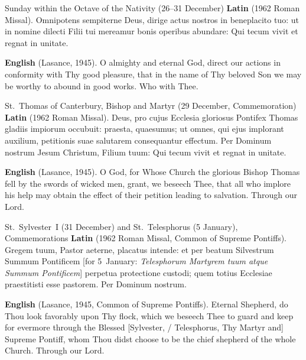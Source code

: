 \begin{massbox}{Sunday within the Octave of the Nativity (26--31 December)}
\textbf{Latin} (1962 Roman Missal). Omnipotens sempiterne Deus, dirige actus
nostros in beneplacito tuo: ut in nomine dilecti Filii tui mereamur bonis
operibus abundare: Qui tecum vivit et regnat in unitate.

\textbf{English} (Lasance, 1945). O almighty and eternal God, direct our actions
in conformity with Thy good pleasure, that in the name of Thy beloved Son we may
be worthy to abound in good works. Who with Thee.
\end{massbox}

\begin{massbox}{St.~Thomas of Canterbury, Bishop and Martyr (29 December, Commemoration)}
\textbf{Latin} (1962 Roman Missal). Deus, pro cujus Ecclesia gloriosus Pontifex
Thomas gladiis impiorum occubuit: praesta, quaesumus; ut omnes, qui ejus
implorant auxilium, petitionis suae salutarem consequantur effectum. Per Dominum
nostrum Jesum Christum, Filium tuum: Qui tecum vivit et regnat in unitate.

\textbf{English} (Lasance, 1945). O God, for Whose Church the glorious Bishop
Thomas fell by the swords of wicked men, grant, we beseech Thee, that all who
implore his help may obtain the effect of their petition leading to salvation.
Through our Lord.
\end{massbox}

\begin{massbox}{St.~Sylvester~I (31 December) and St.~Telesphorus (5 January), Commemorations}
\textbf{Latin} (1962 Roman Missal, Common of Supreme Pontiffs). Gregem tuum,
Pastor aeterne, placatus intende: et per beatum Silvestrum Summum Pontificem
[for 5~January: \textit{Telesphorum Martyrem tuum atque Summum Pontificem}]
perpetua protectione custodi; quem totius Ecclesiae praestitisti esse pastorem.
Per Dominum nostrum.

\textbf{English} (Lasance, 1945, Common of Supreme Pontiffs). Eternal Shepherd,
do Thou look favorably upon Thy flock, which we beseech Thee to guard and keep
for evermore through the Blessed [Sylvester, / Telesphorus, Thy Martyr and]
Supreme Pontiff, whom Thou didst choose to be the chief shepherd of the whole
Church. Through our Lord.
\end{massbox}

